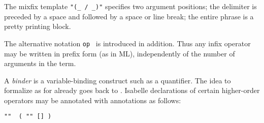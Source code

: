 \begin{isabellebody}
\begin{isamarkuptext}
  The mixfix template \verb|"(_ |\verb|/ _)"|
  specifies two argument positions; the delimiter is preceded by a
  space and followed by a space or line break; the entire phrase is a
  pretty printing block.

  The alternative notation \verb|op|~ is introduced
  in addition.  Thus any infix operator may be written in prefix form
  (as in ML), independently of the number of arguments in the term.%
\end{isamarkuptext}%
\isamarkuptrue%
%
\isamarkuptrue%
%
\begin{isamarkuptext}%
A \emph{binder} is a variable-binding construct such as a
  quantifier.  The idea to formalize  as  for  already goes back
  to \cite{church40}.  Isabelle declarations of certain higher-order
  operators may be annotated with \hypertarget{keyword.binder}{\hyperlink{keyword.binder}{\mbox{}}} annotations
  as follows:

  \begin{center}
  \verb|"|\verb|"  (|\hyperlink{keyword.binder}{\mbox{}}\verb| "|\verb|" [|\verb|] |\verb|)|
  \end{center}


\end{isamarkuptext}
\end{isabellebody}
